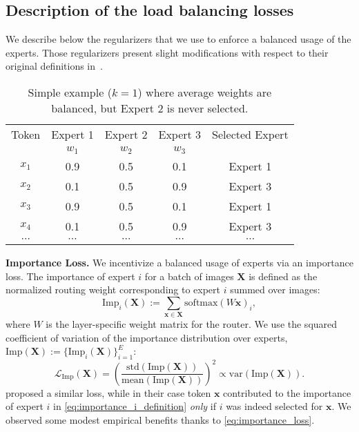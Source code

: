 \documentclass{article}
\begin{document}
\subsection{Description of the load balancing losses}

We describe below the regularizers that we use to enforce a balanced usage of the experts.
Those regularizers present slight modifications with respect to their original definitions in~\cite{shazeer2017outrageously}. 

\begin{table}
\begin{center}
\begin{tabular}{ c|c|c|c|c } 

 Token & Expert 1 & Expert 2 & Expert 3 & Selected Expert \\
  & $w_1$ & $w_2$ & $w_3$ &  \\
 \hline
 $x_1$ & 0.9 & 0.5 & 0.1 & Expert 1 \\ 
 $x_2$ & 0.1 & 0.5 & 0.9 & Expert 3 \\
 $x_3$ & 0.9 & 0.5 & 0.1 & Expert 1 \\ 
 $x_4$ & 0.1 & 0.5 & 0.9 & Expert 3 \\
 $\cdots$ & $\cdots$ & $\cdots$ & $\cdots$ & $\cdots$ \\
\end{tabular}
\vspace*{3mm}
\caption{\label{tab:load_loss_required} Simple example ($k=1$) where average weights are balanced, but Expert 2 is never selected.}
\end{center}
\end{table}

\textbf{Importance Loss.}
We incentivize a balanced usage of experts via an importance loss.
The importance of expert $i$ for a batch of images $\mathbf{X}$ is defined as the normalized routing weight corresponding to expert $i$ summed over images:
\begin{equation}\label{eq:importance_i_definition}
    \text{Imp}_i(\mathbf{X}) := \sum_{\mathbf{x} \in \mathbf{X}} \text{softmax} (W\mathbf{x})_i,
\end{equation}
where $W$ is the layer-specific weight matrix for the router. 
We use the squared coefficient of variation of the importance distribution over experts, $\text{Imp}(\mathbf{X}) := \{ \text{Imp}_i(\mathbf{X}) \}_{i=1}^E$:
\begin{equation}\label{eq:importance_loss}
    \mathcal{L}_{\text{Imp}}(\mathbf{X}) = \left( \frac{\text{std}(\text{Imp}(\mathbf{X}))}{\text{mean}(\text{Imp}(\mathbf{X}))} \right)^2 \propto \text{var}(\text{Imp}(\mathbf{X})).
\end{equation}
\cite{shazeer2017outrageously} proposed a similar loss, while in their case token $\mathbf{x}$ contributed to the importance of expert $i$ in \cref{eq:importance_i_definition} \emph{only} if $i$ was indeed selected for $\mathbf{x}$.
We observed some modest empirical benefits thanks to \cref{eq:importance_loss}.
\end{document}
